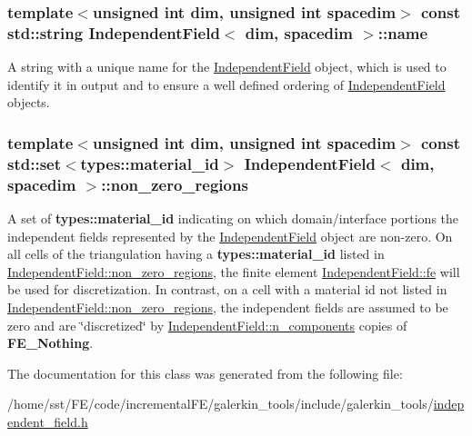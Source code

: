\subsubsection[{\texorpdfstring{name}{name}}]{\setlength{\rightskip}{0pt plus 5cm}template$<$unsigned int dim, unsigned int spacedim$>$ const std\+::string {\bf Independent\+Field}$<$ dim, spacedim $>$\+::name}\hypertarget{class_independent_field_ae05f8565e4ce1a70b5b833555dc084b5}{}\label{class_independent_field_ae05f8565e4ce1a70b5b833555dc084b5}
A string with a unique name for the \hyperlink{class_independent_field}{Independent\+Field} object, which is used to identify it in output and to ensure a well defined ordering of \hyperlink{class_independent_field}{Independent\+Field} objects. 
\subsubsection[{\texorpdfstring{non\+\_\+zero\+\_\+regions}{non_zero_regions}}]{\setlength{\rightskip}{0pt plus 5cm}template$<$unsigned int dim, unsigned int spacedim$>$ const std\+::set$<${\bf types\+::material\+\_\+id}$>$ {\bf Independent\+Field}$<$ dim, spacedim $>$\+::non\+\_\+zero\+\_\+regions}\hypertarget{class_independent_field_a4e09e114870c0b3761bc2e32916e5850}{}\label{class_independent_field_a4e09e114870c0b3761bc2e32916e5850}
A set of {\bf types\+::material\+\_\+id} indicating on which domain/interface portions the independent fields represented by the \hyperlink{class_independent_field}{Independent\+Field} object are non-\/zero. On all cells of the triangulation having a {\bf types\+::material\+\_\+id} listed in \hyperlink{class_independent_field_a4e09e114870c0b3761bc2e32916e5850}{Independent\+Field\+::non\+\_\+zero\+\_\+regions}, the finite element \hyperlink{class_independent_field_a1c583665b7710bd3b815b03ba026b6d3}{Independent\+Field\+::fe} will be used for discretization. In contrast, on a cell with a material id not listed in \hyperlink{class_independent_field_a4e09e114870c0b3761bc2e32916e5850}{Independent\+Field\+::non\+\_\+zero\+\_\+regions}, the independent fields are assumed to be zero and are \char`\"{}discretized\char`\"{} by \hyperlink{class_independent_field_a7b19ea8c30d72cf27f05669de61f30a8}{Independent\+Field\+::n\+\_\+components} copies of {\bf F\+E\+\_\+\+Nothing}. 

The documentation for this class was generated from the following file\+:\begin{DoxyCompactItemize}
\item 
/home/sst/\+F\+E/code/incremental\+F\+E/galerkin\+\_\+tools/include/galerkin\+\_\+tools/\hyperlink{independent__field_8h}{independent\+\_\+field.\+h}\end{DoxyCompactItemize}
